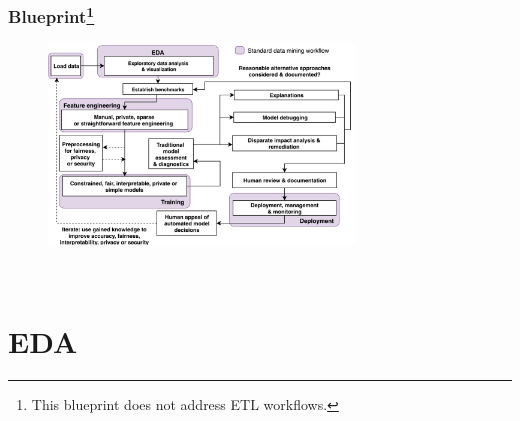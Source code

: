 \documentclass[11pt,
               aspectratio=169,
               hyperref={colorlinks}
               ]{beamer}
\begin{document}
		\begin{frame}				
		
			\frametitle{Blueprint\footnote{\tiny{This blueprint does not address ETL workflows.}}}
							
			\begin{figure}[htb]
				\begin{center}
					\includegraphics[height=150pt]{img/blueprint.png}
					\label{fig:blueprint}
				\end{center}
			\end{figure}		
		
			\centering \
		
		\end{frame}


%	
%		
%			
%		
%
	\section{EDA}
	
\end{document}
